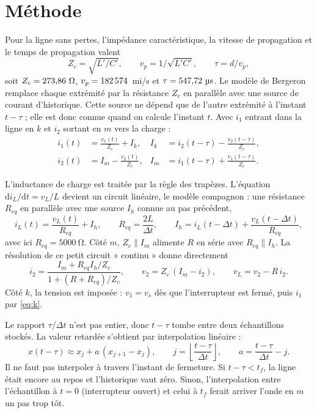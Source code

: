\section{Méthode}

Pour la ligne sans pertes, l'impédance caractéristique, la vitesse de propagation et le temps de
propagation valent
\begin{equation}
Z_c = \sqrt{L'/C'}, \qquad v_p = 1/\sqrt{L'C'}, \qquad \tau = d/v_p ,
\end{equation}
soit $Z_c = \Zc~\unit{\ohm}$, $v_p = 182\,574$~mi/s et $\tau = \tauL~\unit{\micro s}$.
Le modèle de Bergeron remplace chaque extrémité par la résistance $Z_c$ en parallèle avec une
source de courant d'historique. Cette source ne dépend que de l'autre extrémité à l'instant
$t-\tau$ ; elle est donc connue quand on calcule l'instant $t$. Avec $i_1$ entrant dans la ligne
en $k$ et $i_2$ sortant en $m$ vers la charge :
\begin{align}
i_1(t) &= \frac{v_1(t)}{Z_c} + I_k, & I_k &= i_2(t-\tau) - \frac{v_2(t-\tau)}{Z_c}, \label{eq:k}\\
i_2(t) &= I_m - \frac{v_2(t)}{Z_c}, & I_m &= i_1(t-\tau) + \frac{v_1(t-\tau)}{Z_c}. \label{eq:m}
\end{align}

L'inductance de charge est traitée par la règle des trapèzes. L'équation
$\mathrm{d}i_L/\mathrm{d}t = v_L/L$ devient un circuit linéaire, le modèle compagnon : une
résistance $R_{eq}$ en parallèle avec une source $I_h$ connue au pas précédent,
\begin{equation}
i_L(t) = \frac{v_L(t)}{R_{eq}} + I_h, \qquad R_{eq} = \frac{2L}{\Delta t}, \qquad
I_h = i_L(t-\Delta t) + \frac{v_L(t-\Delta t)}{R_{eq}} ,
\end{equation}
avec ici $R_{eq} = \SI{5000}{\ohm}$. Côté $m$, $Z_c \parallel I_m$ alimente $R$ en série avec
$R_{eq} \parallel I_h$. La résolution de ce petit circuit « continu » donne directement
\begin{equation}
i_2 = \frac{I_m + R_{eq} I_h/Z_c}{1 + (R+R_{eq})/Z_c}, \qquad v_2 = Z_c\,(I_m - i_2), \qquad
v_L = v_2 - R\,i_2 .
\end{equation}
Côté $k$, la tension est imposée : $v_1 = v_s$ dès que l'interrupteur est fermé, puis $i_1$ par
\eqref{eq:k}.

Le rapport $\tau/\Delta t$ n'est pas entier, donc $t-\tau$ tombe entre deux échantillons
stockés. La valeur retardée s'obtient par interpolation linéaire :
\begin{equation}
x(t-\tau) \approx x_j + a\,(x_{j+1}-x_j), \qquad j = \left\lfloor \frac{t-\tau}{\Delta t}
\right\rfloor, \qquad a = \frac{t-\tau}{\Delta t} - j .
\end{equation}
Il ne faut pas interpoler à travers l'instant de fermeture. Si $t-\tau < t_f$, la ligne était
encore au repos et l'historique vaut zéro. Sinon, l'interpolation entre l'échantillon à $t=0$
(interrupteur ouvert) et celui à $t_f$ ferait arriver l'onde en $m$ un pas trop tôt.

